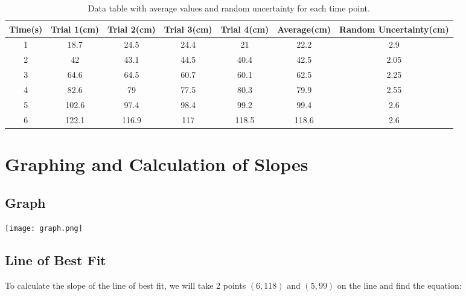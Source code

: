 \documentclass[12pt, letterpaper]{article}
\begin{document}
\begin{table}[h!]
\centering
\small
\begin{tabular}
{|@{}c@{}|@{}c@{}|@{}c@{}|@{}c@{}|@{}c@{}|@{}c@{}|@{}c@{}|@{}}
\hline
\textbf{Time(s)} & \textbf{Trial 1(cm)} & \textbf{Trial 2(cm)} & \textbf{Trial 3(cm)} & \textbf{Trial 4(cm)} & \textbf{Average(cm)} & \textbf{Random Uncertainty(cm)} \\ \hline
1                & 18.7                  & 24.5                  & 24.4                  & 21                    & 22.2                  & 2.9                               \\ \hline
2                & 42                    & 43.1                  & 44.5                  & 40.4                  & 42.5                  & 2.05                              \\ \hline
3                & 64.6                  & 64.5                  & 60.7                  & 60.1                  & 62.5                  & 2.25                              \\ \hline
4                & 82.6                  & 79                    & 77.5                  & 80.3                  & 79.9                  & 2.55                              \\ \hline
5                & 102.6                 & 97.4                  & 98.4                  & 99.2                  & 99.4                  & 2.6                               \\ \hline
6                & 122.1                 & 116.9                 & 117                   & 118.5                 & 118.6                 & 2.6                               \\ \hline
\end{tabular}

\caption{Data table with average values and random uncertainty for each time point.}
\end{table}

\section{Graphing and Calculation of Slopes}
\subsection{Graph}
\texttt{[image: graph.png]}
\subsection{Line of Best Fit}
To calculate the slope of the line of best fit, we will take 2 points $(6,118)$ and $(5,99)$ on the line and find the equation:
\end{document}
